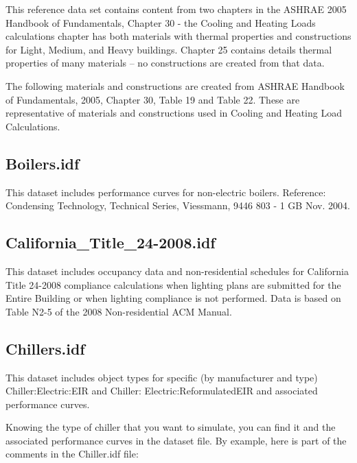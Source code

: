 This reference data set contains content from two chapters in the ASHRAE 2005 Handbook of Fundamentals, Chapter 30 - the Cooling and Heating Loads calculations chapter has both materials with thermal properties and constructions for Light, Medium, and Heavy buildings. Chapter 25 contains details thermal properties of many materials -- no constructions are created from that data.

The following materials and constructions are created from ASHRAE Handbook of Fundamentals, 2005, Chapter 30, Table 19 and Table 22. These are representative of materials and constructions used in Cooling and Heating Load Calculations.

\subsection{Boilers.idf}\label{boilers.idf}

This dataset includes performance curves for non-electric boilers. Reference: Condensing Technology, Technical Series, Viessmann, 9446 803 - 1 GB Nov. 2004.

\subsection{California\_Title\_24-2008.idf}\label{californiaux5ftitleux5f24-2008.idf}

This dataset includes occupancy data and non-residential schedules for California Title 24-2008 compliance calculations when lighting plans are submitted for the Entire Building or when lighting compliance is not performed. Data is based on Table N2-5 of the 2008 Non-residential ACM Manual.

\subsection{Chillers.idf}\label{chillers.idf}

This dataset includes object types for specific (by manufacturer and type) Chiller:Electric:EIR and Chiller: Electric:ReformulatedEIR and associated performance curves.

Knowing the type of chiller that you want to simulate, you can find it and the associated performance curves in the dataset file. By example, here is part of the comments in the Chiller.idf file:

